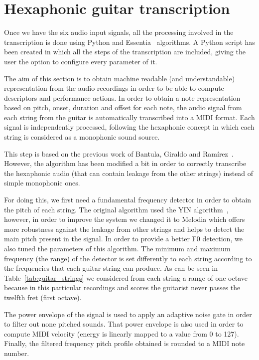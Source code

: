 \section{Hexaphonic guitar transcription}
Once we have the six audio input signals, all the processing involved in the transcription is done using Python and Essentia~\cite{bogdanov2013essentia} algorithms. A Python script has been created in which all the steps of the transcription are included, giving the user the option to configure every parameter of it.

The aim of this section is to obtain machine readable (and understandable) representation from the audio recordings in order to be able to compute descriptors and performance actions. In order to obtain a note representation based on pitch, onset, duration and offset for each note, the audio signal from each string from the guitar is automatically transcribed into a MIDI format. Each signal is independently processed, following the hexaphonic concept in which each string is considered as a monophonic sound source. 

This step is based on the previous work of Bantula, Giraldo and Ramírez~\cite{bantula2016}. However, the algorithm has been modified a bit in order to correctly transcribe the hexaphonic audio (that can contain leakage from the other strings) instead of simple monophonic ones.

For doing this, we first need a fundamental frequency detector in order to obtain the pitch of each string. The original algorithm used the YIN algorithm~\cite{Cheveigne2002}, however, in order to improve the system we changed it to Melodia which offers more robustness against the leakage from other strings and helps to detect the main pitch present in the signal. In order to provide a better F0 detection, we also tuned the parameters of this algorithm. The minimum and maximum frequency (the range) of the detector is set differently to each string according to the frequencies that each guitar string can produce. As can be seen in Table~\ref{tab:guitar_strings} we considered from each string a range of one octave because in this particular recordings and scores the guitarist never passes the twelfth fret (first octave).


The power envelope of the signal is used to apply an adaptive noise gate in order to filter out none pitched sounds. That power envelope is also used in order to compute MIDI velocity (energy is linearly mapped to a value from 0 to 127). Finally, the filtered frequency pitch profile obtained is rounded to a MIDI note number.

